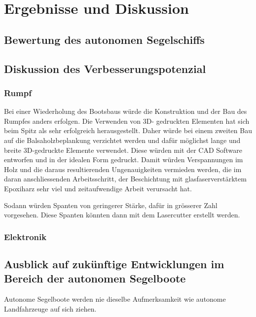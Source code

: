 

\chapter{Ergebnisse und Diskussion }
\label{chap:diskussion}

\section{Bewertung des autonomen Segelschiffs}




\section{Diskussion des Verbesserungspotenzial}
\subsection{Rumpf}
Bei einer Wiederholung des Bootsbaus würde die Konstruktion und der Bau des Rumpfes anders erfolgen. Die Verwenden von 3D- gedruckten Elementen hat sich beim Spitz als sehr erfolgreich herausgestellt. Daher würde bei einem zweiten Bau auf die Balsaholzbeplankung verzichtet werden und dafür möglichst lange und breite 3D-gedruckte Elemente verwendet. Diese würden mit der CAD Software entworfen und in der idealen Form gedruckt. Damit  würden Verspannungen im Holz und die daraus resultierenden Ungenauigkeiten  vermieden werden, die im daran anschliessenden Arbeitsschritt, der Beschichtung mit glasfaserverstärktem Epoxiharz sehr viel und zeitaufwendige Arbeit verursacht hat.

Sodann würden Spanten von geringerer Stärke, dafür in grösserer Zahl vorgesehen. Diese Spanten könnten dann mit dem Lasercutter erstellt werden.  

\subsection{Elektronik}



\section{Ausblick auf zukünftige Entwicklungen im Bereich der autonomen Segelboote}
Autonome Segelboote werden nie dieselbe Aufmerksamkeit wie autonome Landfahrzeuge auf sich ziehen. 

